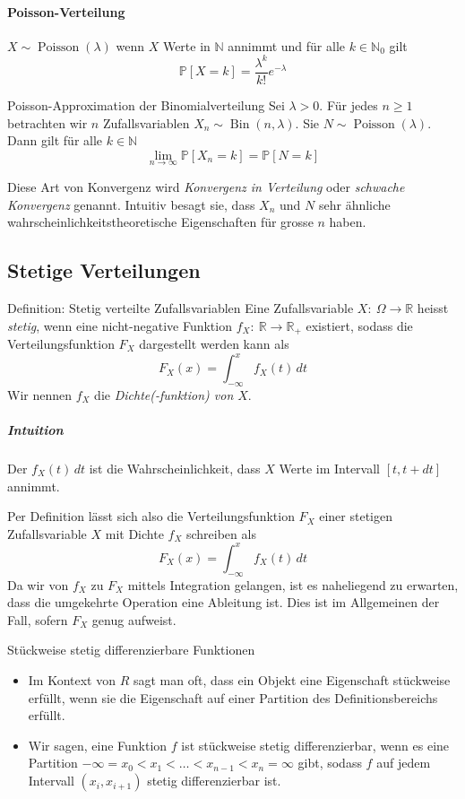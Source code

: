 \documentclass[a4paper,10pt]{article}
\def\N{\mathbb{N}}
\def\R{\mathbb{R}}
\def\P{\mathbb{P}}
\DeclareMathOperator{\Binomial}{\mathrm{Bin}}
\DeclareMathOperator{\Poisson}{\mathrm{Poisson}}
\begin{document}
\paragraph{Poisson-Verteilung} \( X \sim \Poisson(\lambda) \) wenn \( X \) Werte in \( \N \) annimmt und für alle \( k \in \N_0\) gilt
\[ \P[X = k] = \frac{\lambda^k}{k!} e^{-\lambda} \]

\begin{subbox}{Poisson-Approximation der Binomialverteilung}
    Sei \( \lambda > 0 \). Für jedes \( n \geq 1 \) betrachten wir \( n \) Zufallsvariablen \( X_n \sim \Binomial(n, \lambda) \). Sie \( N \sim \Poisson(\lambda) \). Dann gilt für alle \( k \in \N \)
    \[ \lim_{n \to \infty} \P[X_n = k] = \P[N = k] \]
\end{subbox}

Diese Art von Konvergenz wird \emph{Konvergenz in Verteilung} oder \emph{schwache Konvergenz} genannt. Intuitiv besagt sie, dass \( X_n \) und \( N \) sehr ähnliche wahrscheinlichkeitstheoretische Eigenschaften für grosse \( n \) haben.


\subsection{Stetige Verteilungen}

\begin{mainbox}{Definition: Stetig verteilte Zufallsvariablen}
    Eine Zufallsvariable \( X: \: \Omega \to \R \) heisst \emph{stetig}, wenn eine nicht-negative Funktion \( f_X: \: \R \to \R_+ \) existiert, sodass die Verteilungsfunktion \( F_X \) dargestellt werden kann als
    \[ F_X(x) = \int_{-\infty}^x f_X(t) \, dt \]
    Wir nennen \( f_X \) die \emph{Dichte(-funktion) von \( X \)}.
\end{mainbox}

\subparagraph{Intuition} Der  \( f_X(t) \, dt \) ist die Wahrscheinlichkeit, dass \( X \) Werte im Intervall \( [t, t + dt] \) annimmt.

Per Definition lässt sich also die Verteilungsfunktion \( F_X \) einer stetigen Zufallsvariable \( X \) mit Dichte \( f_X \) schreiben als
\[ F_X(x) = \int_{-\infty}^x f_X(t) \, dt \]
Da wir von \( f_X \) zu \( F_X \) mittels Integration gelangen, ist es naheliegend zu erwarten, dass die umgekehrte Operation eine Ableitung ist. Dies ist im Allgemeinen der Fall, sofern \( F_X \) genug  aufweist.

\begin{mainbox}{Stückweise stetig differenzierbare Funktionen}
    \begin{itemize}
        \item Im Kontext von \( R \) sagt man oft, dass ein Objekt eine Eigenschaft stückweise erfüllt, wenn sie die Eigenschaft auf einer Partition des Definitionsbereichs erfüllt.
        \item Wir sagen, eine Funktion \( f \) ist stückweise stetig differenzierbar, wenn es eine Partition \( -\infty = x_0 < x_1 < \dots < x_{n - 1} < x_n = \infty \) gibt, sodass \( f \) auf jedem Intervall \( (x_i, x_{i + 1}) \) stetig differenzierbar ist.
    \end{itemize}
\end{mainbox}
\end{document}
